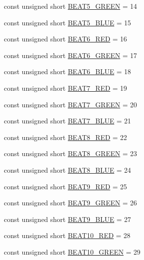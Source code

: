 \begin{DoxyCompactItemize}
\item 
const unsigned short \hyperlink{namespaceoutputs_a4b1e0d3ad2b80752a68cdec9a73f5ac6}{B\+E\+A\+T5\+\_\+\+G\+R\+E\+EN} = 14
\item 
const unsigned short \hyperlink{namespaceoutputs_a0fab71f89a857d67f1329fbd097046ae}{B\+E\+A\+T5\+\_\+\+B\+L\+UE} = 15
\item 
const unsigned short \hyperlink{namespaceoutputs_a44e21deb20acdd11aa47bd5c2358dd6c}{B\+E\+A\+T6\+\_\+\+R\+ED} = 16
\item 
const unsigned short \hyperlink{namespaceoutputs_a55c3bd8cf6cdffbd199abc9ae5a0e1ac}{B\+E\+A\+T6\+\_\+\+G\+R\+E\+EN} = 17
\item 
const unsigned short \hyperlink{namespaceoutputs_a1981eea86b118b5ff49c09ee50a75221}{B\+E\+A\+T6\+\_\+\+B\+L\+UE} = 18
\item 
const unsigned short \hyperlink{namespaceoutputs_a88730a5804ff8785e2fb07a1957a243c}{B\+E\+A\+T7\+\_\+\+R\+ED} = 19
\item 
const unsigned short \hyperlink{namespaceoutputs_a971ea0c6742c83be5634cbf533cfb050}{B\+E\+A\+T7\+\_\+\+G\+R\+E\+EN} = 20
\item 
const unsigned short \hyperlink{namespaceoutputs_a7051f5db20e6f0c0dc7dad8775d21b1f}{B\+E\+A\+T7\+\_\+\+B\+L\+UE} = 21
\item 
const unsigned short \hyperlink{namespaceoutputs_aeb7e7b9874ac290d2ff579a8b144fe13}{B\+E\+A\+T8\+\_\+\+R\+ED} = 22
\item 
const unsigned short \hyperlink{namespaceoutputs_a6fe56e04e6ce7835262e2a60df0506d6}{B\+E\+A\+T8\+\_\+\+G\+R\+E\+EN} = 23
\item 
const unsigned short \hyperlink{namespaceoutputs_a29cf0b90cc4df367e62aaaa86e7ed24e}{B\+E\+A\+T8\+\_\+\+B\+L\+UE} = 24
\item 
const unsigned short \hyperlink{namespaceoutputs_a57a4d2c831b8b263bc763032afddaa03}{B\+E\+A\+T9\+\_\+\+R\+ED} = 25
\item 
const unsigned short \hyperlink{namespaceoutputs_a0600b91e575643cfee3eb9e9e5b14839}{B\+E\+A\+T9\+\_\+\+G\+R\+E\+EN} = 26
\item 
const unsigned short \hyperlink{namespaceoutputs_a1f88716cbf83123bc10bd31b07f86b4c}{B\+E\+A\+T9\+\_\+\+B\+L\+UE} = 27
\item 
const unsigned short \hyperlink{namespaceoutputs_a3108e2ed7adaa0c15822673c1cf5341d}{B\+E\+A\+T10\+\_\+\+R\+ED} = 28
\item 
const unsigned short \hyperlink{namespaceoutputs_ab0b662f329ea65f6f5fc1acba70fbd07}{B\+E\+A\+T10\+\_\+\+G\+R\+E\+EN} = 29

\end{DoxyCompactItemize}
